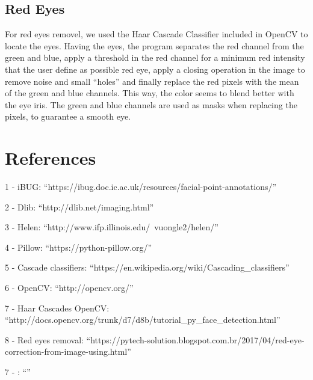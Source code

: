 \documentclass[12pt,a4paper]{article}
\begin{document}
\subsection{Red Eyes}
    For red eyes removel, we used the Haar Cascade Classifier included in OpenCV to locate the eyes. Having the eyes, the program separates the red channel from the green and blue, apply a threshold in the red channel for a minimum red intensity that the user define as possible red eye, apply a closing operation in the image to remove noise and small ``holes'' and finally replace the red pixels with the mean of the green and blue channels. This way, the color seems to blend better with the eye iris.
    The green and blue channels are used as masks when replacing the pixels, to guarantee a smooth eye.

\section{References}

1 - iBUG: ``https://ibug.doc.ic.ac.uk/resources/facial-point-annotations/''\\
\par 2 - Dlib: ``http://dlib.net/imaging.html''\\
\par 3 - Helen: ``http://www.ifp.illinois.edu/~vuongle2/helen/'' \\
\par 4 - Pillow: ``https://python-pillow.org/'' \\
\par 5 - Cascade classifiers: ``https://en.wikipedia.org/wiki/Cascading_classifiers'' \\
\par 6 - OpenCV: ``http://opencv.org/'' \\
\par 7 - Haar Cascades OpenCV: ``http://docs.opencv.org/trunk/d7/d8b/tutorial_py_face_detection.html'' \\

\par 8 - Red eyes removal: ``https://pytech-solution.blogspot.com.br/2017/04/red-eye-correction-from-image-using.html'' \\ %
\par 7 - : ``'' \\
\end{document}

